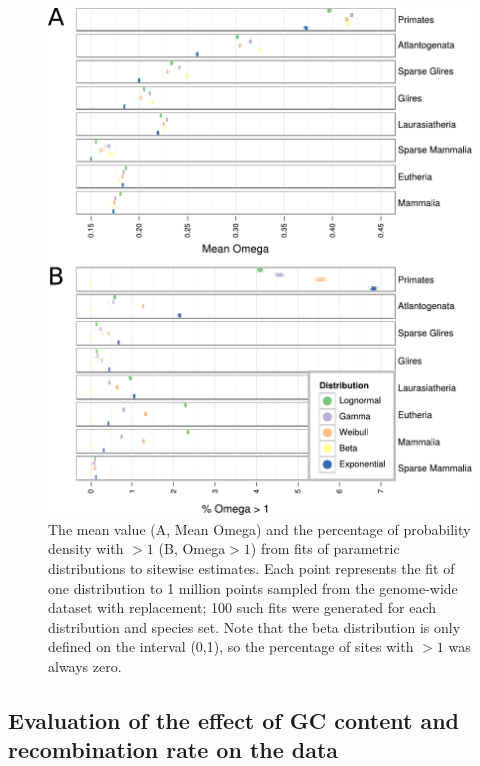 \begin{figure}
\centering
\includegraphics[scale=0.85]{Figs/distribution_fit_plots.pdf}
\caption{The mean value (A, Mean Omega) and the percentage of probability
  density with \omg$>1$ (B, Omega$>1$) from \ml fits of parametric distributions to
  sitewise \ci estimates. Each point represents the \ml fit of one
  distribution to 1 million points sampled from the genome-wide
  dataset with replacement; 100 such fits were generated for each
  distribution and species set. Note that the beta distribution is
  only defined on the interval (0,1), so the percentage of sites with
  \omg$>1$ was always zero.}
\label{fig_distribution_fit_plots}
\end{figure}


\subsection{Evaluation of the effect of GC content and recombination rate on the \sw data}





